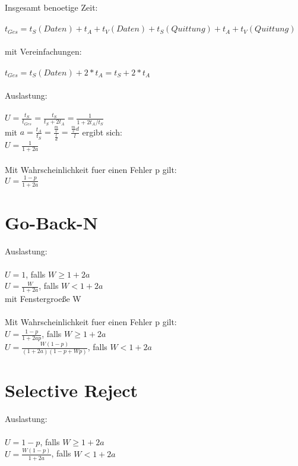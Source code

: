 \documentclass[a4paper]{scrreprt}
\begin{document}
Insgesamt benoetige Zeit:\\\\
$t_{Ges} = t_S(Daten) + t_A + t_V(Daten) + t_S(Quittung) + t_A + t_V(Quittung)$\\\\

mit Vereinfachungen:\\\\
$t_{Ges} = t_S(Daten) + 2 * t_A = t_S + 2* t_A$\\\\

Auslastung:\\\\
$U = \frac{t_S}{t_{Ges}} = \frac{t_S}{t_S + 2t_A} = \frac{1}{1 + 2t_A/t_S}$\\
mit $a = \frac{t_A}{t_S} = \frac{\frac{m}{v}}{\frac{l}{d}} = \frac{\frac{m}{v}d}{l}$ ergibt sich:\\
$U = \frac{1}{1 + 2a}$\\\\

Mit Wahrscheinlichkeit fuer einen Fehler p gilt:\\
$U = \frac{1-p}{1 + 2a}$

\section{Go-Back-N}

Auslastung:\\\\
$U = 1$, falls $W \geq 1 + 2a$\\
$U = \frac{W}{1 + 2a}$, falls $W < 1 + 2a$\\
mit Fenstergroeße W\\\\

Mit Wahrscheinlichkeit fuer einen Fehler p gilt:\\
$U = \frac{1 - p}{1 + 2ap}$, falls $W \geq 1 + 2a$\\
$U = \frac{W(1-p)}{(1 + 2a)(1 - p + Wp)}$, falls $W < 1 + 2a$\\

\section{Selective Reject}

Auslastung:\\\\
$U = 1 - p$, falls $W \geq 1 + 2a$\\
$U = \frac{W(1-p)}{1 + 2a}$, falls $W < 1 + 2a$\\
\end{document}
